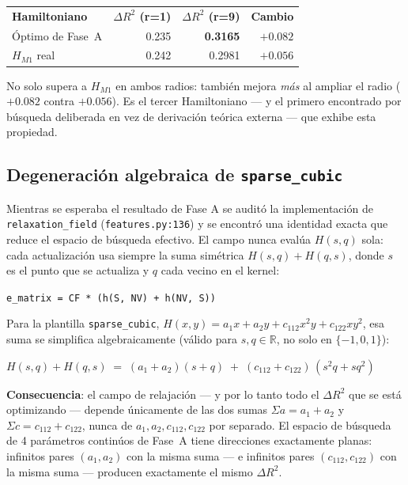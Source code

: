 \documentclass[11pt, a4paper]{article}
\newcommand{\TH}[1]{\cellcolor{cTHbg}\color{white}\textbf{#1}}
\newcommand{\good}[1]{\color{cGood}\textbf{#1}}
\begin{document}
\medskip
\begin{center}
\begin{tabular}{lrrr}
  \TH{Hamiltoniano} & \TH{$\Delta R^2$ (r=1)} & \TH{$\Delta R^2$ (r=9)} & \TH{Cambio} \\[1pt]
  \'Optimo de Fase~A & 0.235 & \good{0.3165} & \good{$+0.082$} \\
  $H_{M1}$ real       & 0.242 & 0.2981          & $+0.056$ \\
\end{tabular}
\end{center}
\medskip

No solo supera a $H_{M1}$ en ambos radios: tambi\'en mejora \emph{m\'as}
al ampliar el radio ($+0.082$ contra $+0.056$). Es el tercer
Hamiltoniano --- y el primero encontrado por b\'usqueda deliberada en
vez de derivaci\'on te\'orica externa --- que exhibe esta propiedad.

\subsection{Degeneraci\'on algebraica de \texttt{sparse\_cubic}}
\label{sec:degeneracion}

Mientras se esperaba el resultado de Fase A se audit\'o la
implementaci\'on de \texttt{relaxation\_field} (\texttt{features.py:136})
y se encontr\'o una identidad exacta que reduce el espacio de
b\'usqueda efectivo. El campo nunca eval\'ua $H(s,q)$ sola: cada
actualizaci\'on usa siempre la suma sim\'etrica $H(s,q)+H(q,s)$, donde
$s$ es el punto que se actualiza y $q$ cada vecino en el kernel:

\begin{tcolorbox}[codebox]
\texttt{e\_matrix = CF * (h(S, NV) + h(NV, S))}
\end{tcolorbox}

Para la plantilla \texttt{sparse\_cubic},
$H(x,y)=a_1x+a_2y+c_{112}x^2y+c_{122}xy^2$, esa suma se simplifica
algebraicamente (v\'alido para $s,q\in\mathbb{R}$, no solo en
$\{-1,0,1\}$):

\begin{tcolorbox}[codebox]
$H(s,q)+H(q,s) \;=\; (a_1+a_2)(s+q) \;+\; (c_{112}+c_{122})\,(s^2q+sq^2)$
\end{tcolorbox}

\begin{tcolorbox}[quotebox]
  \textbf{Consecuencia}: el campo de relajaci\'on --- y por lo tanto
  todo el $\Delta R^2$ que se est\'a optimizando --- depende
  \'unicamente de las dos sumas $\Sigma a = a_1+a_2$ y
  $\Sigma c = c_{112}+c_{122}$, nunca de $a_1,a_2,c_{112},c_{122}$
  por separado. El espacio de b\'usqueda de 4 par\'ametros contin\'uos
  de Fase~A tiene direcciones exactamente planas: infinitos pares
  $(a_1,a_2)$ con la misma suma --- e infinitos pares
  $(c_{112},c_{122})$ con la misma suma --- producen exactamente el
  mismo $\Delta R^2$.
\end{tcolorbox}
\end{document}
